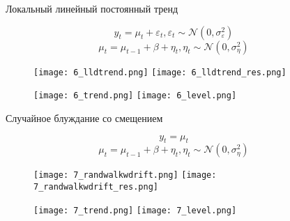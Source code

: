 \documentclass{beamer}
\begin{document}
\begin{frame}[fragile]
\begin{columns}[T]
\begin{column}{.32\textwidth}
\end{column}

\begin{column}{.32\textwidth}

\begin{block}{Локальный линейный постоянный тренд}

\vspace{-0.25cm}

\[
y_t = \mu_t + \varepsilon_t, \varepsilon_t \sim \mathcal{N}(0, \sigma^2_\varepsilon)
\]
\[
\mu_t = \mu_{t-1} + \beta + \eta_t, \eta_t \sim \mathcal{N}(0, \sigma^2_\eta)
\]

\begin{figure}[htb]
  \texttt{[image: 6\_lldtrend.png]}
\endminipage\hfill
{}
  \texttt{[image: 6\_lldtrend\_res.png]}
\endminipage\hfill
\end{figure}

\begin{figure}[htb]
  \texttt{[image: 6\_trend.png]}
\endminipage\hfill
{}
  \texttt{[image: 6\_level.png]}
\endminipage\hfill
\end{figure}
\end{block}

\begin{block}{Случайное блуждание со смещением}

\vspace{-0.25cm}

\[
y_t = \mu_t 
\]
\[
\mu_t = \mu_{t-1} + \beta + \eta_t, \eta_t \sim \mathcal{N} (0, \sigma_\eta^2)
\]

\begin{figure}[htb]
  \texttt{[image: 7\_randwalkwdrift.png]}
\endminipage\hfill
{}
  \texttt{[image: 7\_randwalkwdrift\_res.png]}
\endminipage\hfill
\end{figure}

\begin{figure}[htb]
  \texttt{[image: 7\_trend.png]}
\endminipage\hfill
{}
  \texttt{[image: 7\_level.png]}
\endminipage\hfill
\end{figure}
\end{block}

\begin{columns}[T]
\begin{column}{.49\textwidth}


\end{column}
\end{columns}
\end{column}
\end{columns}
\end{frame}
\end{document}

